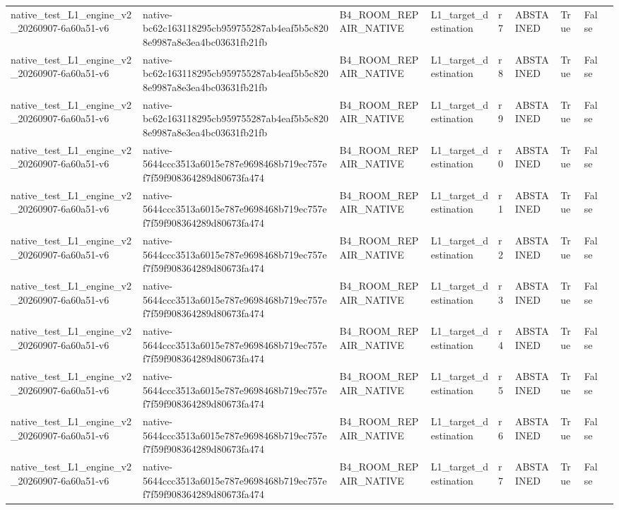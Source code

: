 \begin{tabular}{lllllllll}
native\_test\_L1\_engine\_v2\_20260907-6a60a51-v6 & native-bc62c163118295cb959755287ab4eaf5b5c8208e9987a8e3ea4bc03631fb21fb & B4\_ROOM\_REPAIR\_NATIVE & L1\_target\_destination & r7 & ABSTAINED & True & False &  \\
native\_test\_L1\_engine\_v2\_20260907-6a60a51-v6 & native-bc62c163118295cb959755287ab4eaf5b5c8208e9987a8e3ea4bc03631fb21fb & B4\_ROOM\_REPAIR\_NATIVE & L1\_target\_destination & r8 & ABSTAINED & True & False &  \\
native\_test\_L1\_engine\_v2\_20260907-6a60a51-v6 & native-bc62c163118295cb959755287ab4eaf5b5c8208e9987a8e3ea4bc03631fb21fb & B4\_ROOM\_REPAIR\_NATIVE & L1\_target\_destination & r9 & ABSTAINED & True & False &  \\
native\_test\_L1\_engine\_v2\_20260907-6a60a51-v6 & native-5644ccc3513a6015e787e9698468b719ec757ef7f59f908364289d80673fa474 & B4\_ROOM\_REPAIR\_NATIVE & L1\_target\_destination & r0 & ABSTAINED & True & False &  \\
native\_test\_L1\_engine\_v2\_20260907-6a60a51-v6 & native-5644ccc3513a6015e787e9698468b719ec757ef7f59f908364289d80673fa474 & B4\_ROOM\_REPAIR\_NATIVE & L1\_target\_destination & r1 & ABSTAINED & True & False &  \\
native\_test\_L1\_engine\_v2\_20260907-6a60a51-v6 & native-5644ccc3513a6015e787e9698468b719ec757ef7f59f908364289d80673fa474 & B4\_ROOM\_REPAIR\_NATIVE & L1\_target\_destination & r2 & ABSTAINED & True & False &  \\
native\_test\_L1\_engine\_v2\_20260907-6a60a51-v6 & native-5644ccc3513a6015e787e9698468b719ec757ef7f59f908364289d80673fa474 & B4\_ROOM\_REPAIR\_NATIVE & L1\_target\_destination & r3 & ABSTAINED & True & False &  \\
native\_test\_L1\_engine\_v2\_20260907-6a60a51-v6 & native-5644ccc3513a6015e787e9698468b719ec757ef7f59f908364289d80673fa474 & B4\_ROOM\_REPAIR\_NATIVE & L1\_target\_destination & r4 & ABSTAINED & True & False &  \\
native\_test\_L1\_engine\_v2\_20260907-6a60a51-v6 & native-5644ccc3513a6015e787e9698468b719ec757ef7f59f908364289d80673fa474 & B4\_ROOM\_REPAIR\_NATIVE & L1\_target\_destination & r5 & ABSTAINED & True & False &  \\
native\_test\_L1\_engine\_v2\_20260907-6a60a51-v6 & native-5644ccc3513a6015e787e9698468b719ec757ef7f59f908364289d80673fa474 & B4\_ROOM\_REPAIR\_NATIVE & L1\_target\_destination & r6 & ABSTAINED & True & False &  \\
native\_test\_L1\_engine\_v2\_20260907-6a60a51-v6 & native-5644ccc3513a6015e787e9698468b719ec757ef7f59f908364289d80673fa474 & B4\_ROOM\_REPAIR\_NATIVE & L1\_target\_destination & r7 & ABSTAINED & True & False &  \\

\end{tabular}
